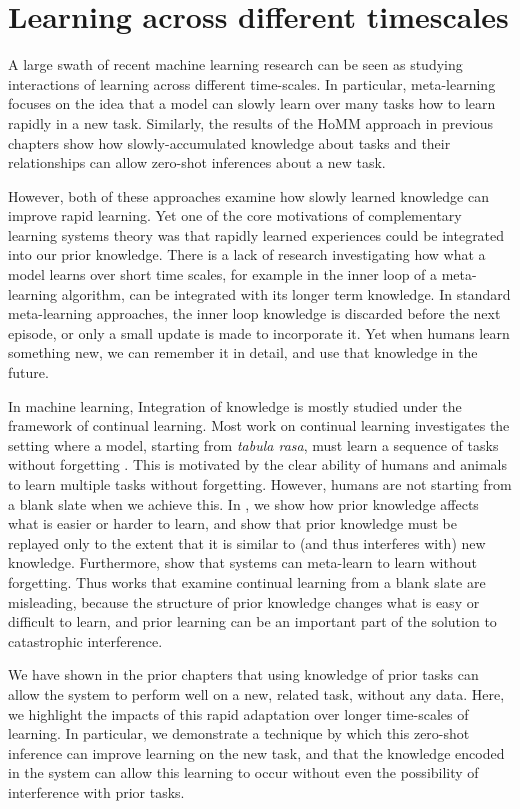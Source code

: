 \chapter{Learning across different timescales} \label{chapter:timescales}

A large swath of recent machine learning research can be seen as studying interactions of learning across different time-scales. In particular, meta-learning focuses on the idea that a model can slowly learn over many tasks how to learn rapidly in a new task. Similarly, the results of the HoMM approach in previous chapters show how slowly-accumulated knowledge about tasks and their relationships can allow zero-shot inferences about a new task. \par 
However, both of these approaches examine how slowly learned knowledge can improve rapid learning. Yet one of the core motivations of complementary learning systems theory was that rapidly learned experiences could be integrated into our prior knowledge. There is a lack of research investigating how what a model learns over short time scales, for example in the inner loop of a meta-learning algorithm, can be integrated with its longer term knowledge. In standard meta-learning approaches, the inner loop knowledge is discarded before the next episode, or only a small update is made to incorporate it. Yet when humans learn something new, we can remember it in detail, and use that knowledge in the future. \par 
In machine learning, Integration of knowledge is mostly studied under the framework of continual learning. Most work on continual learning investigates the setting where a model, starting from \emph{tabula rasa}, must learn a sequence of tasks without forgetting \citep{Ven2018, Atkinson2018}. This is motivated by the clear ability of humans and animals to learn multiple tasks without forgetting. However, humans are not starting from a blank slate when we achieve this. In \citet{McClelland2020}, we show how prior knowledge affects what is easier or harder to learn, and show that prior knowledge must be replayed only to the extent that it is similar to (and thus interferes with) new knowledge. Furthermore, \citet{Velez2017} show that systems can meta-learn to learn without forgetting. Thus works that examine continual learning from a blank slate are misleading, because the structure of prior knowledge changes what is easy or difficult to learn, and prior learning can be an important part of the solution to catastrophic interference. \par 
We have shown in the prior chapters that using knowledge of prior tasks can allow the system to perform well on a new, related task, without any data. Here, we highlight the impacts of this rapid adaptation over longer time-scales of learning. In particular, we demonstrate a technique by which this zero-shot inference can improve learning on the new task, and that the knowledge encoded in the system can allow this learning to occur without even the possibility of interference with prior tasks. \par  

